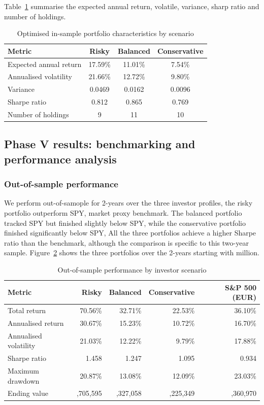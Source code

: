 \documentclass[11pt,a4paper]{article}
\newcommand{\EUR}{\texteuro}
\begin{document}
Table~\ref{tab:scenario-optimized-summary} summarise the expected annual return, volatile, variance, sharp ratio and number of holdings.

\begin{table}[H]
  \centering
  \small
  \caption{Optimised in-sample portfolio characteristics by scenario}
  \label{tab:scenario-optimized-summary}
  \begin{tabular}{lccc}
    \toprule
    Metric & Risky & Balanced & Conservative \\
    \midrule
    Expected annual return & 17.59\% & 11.01\% & 7.54\% \\
    Annualised volatility & 21.66\% & 12.72\% & 9.80\% \\
    Variance & 0.0469 & 0.0162 & 0.0096 \\
    Sharpe ratio & 0.812 & 0.865 & 0.769 \\
    Number of holdings & 9 & 11 & 10 \\
    \bottomrule
  \end{tabular}
\end{table}

\subsection{Phase V results: benchmarking and performance analysis}

\subsubsection{Out-of-sample performance}

We perform out-of-samople for 2-years over the three investor profiles, the risky portfolio outperform SPY, market proxy benchmark. The balanced portfolio tracked SPY but finished slightly below SPY, while the conservative portfolio finished significantly below SPY, All the three portfolios achieve a higher Sharpe ratio than the benchmark, although the comparison is specific to this two-year sample. Figure~\ref{tab:scenario-performance} shows the three portfolios over the 2-years starting with \EUR1 million.

\begin{table}[H]
  \centering
  \small
  \caption{Out-of-sample performance by investor scenario}
  \label{tab:scenario-performance}
  \begin{tabular}{lrrrr}
    \toprule
    Metric & Risky & Balanced & Conservative & S\&P 500 (EUR) \\
    \midrule
    Total return & 70.56\% & 32.71\% & 22.53\% & 36.10\% \\
    Annualised return & 30.67\% & 15.23\% & 10.72\% & 16.70\% \\
    Annualised volatility & 21.03\% & 12.22\% & 9.79\% & 17.88\% \\
    Sharpe ratio & 1.458 & 1.247 & 1.095 & 0.934 \\
    Maximum drawdown & 20.87\% & 13.08\% & 12.09\% & 23.03\% \\
    Ending value & \EUR1,705,595 & \EUR1,327,058 & \EUR1,225,349 & \EUR1,360,970 \\
    \bottomrule
  \end{tabular}
\end{table}
\end{document}

